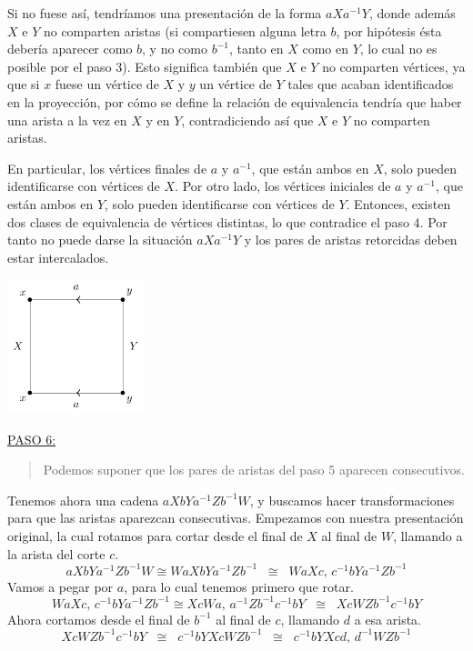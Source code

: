 {    \noindent
    Si no fuese así, tendríamos una presentación de la forma $aXa^{-1}Y$, donde además $X$ e $Y$ no comparten aristas 
    (si compartiesen alguna letra $b$, por hipótesis ésta debería aparecer como $b$, y no como $b^{-1}$, tanto en $X$ como en $Y$, 
    lo cual no es posible por el paso 3). 
    Esto significa también que $X$ e $Y$ no comparten vértices, ya que si $x$ fuese un vértice de $X$ y $y$ un vértice de $Y$ tales que acaban identificados en la proyección,
    por cómo se define la relación de equivalencia tendría que haber una arista a la vez en $X$ y en $Y$, contradiciendo así que $X$ e $Y$ no comparten aristas.

    \vspace{0.5em}
    \noindent
    En particular, los vértices finales de $a$ y $a^{-1}$, que están ambos en $X$, 
    solo pueden identificarse con vértices de $X$. 
    Por otro lado, los vértices iniciales de $a$ y $a^{-1}$, que están ambos en $Y$, 
    solo pueden identificarse con vértices de $Y$. 
    Entonces, existen dos clases de equivalencia de vértices distintas, 
    lo que contradice el paso 4. Por tanto no puede darse la situación $aXa^{-1}Y$ y los pares de aristas retorcidas deben estar intercalados.

    \begin{center}
        \includegraphics[width=0.3\textwidth]{img/teorema-clasificacion/paso5.pdf}
    \end{center}

    \vspace{1.3em}
    \noindent
    \underline{PASO 6:}
    \begin{quote}
        Podemos suponer que los pares de aristas del paso 5 aparecen consecutivos.
    \end{quote}

    \noindent
    Tenemos ahora una cadena $aXbYa^{-1}Zb^{-1}W$, 
    y buscamos hacer transformaciones para que las aristas aparezcan consecutivas. 
    Empezamos con nuestra presentación original, la cual rotamos para cortar desde el final de $X$ al final de $W$, llamando a la arista del corte $c$. 
    \[
        aXbYa^{-1}Zb^{-1}W \cong WaXbYa^{-1}Zb^{-1} \;\;\cong\;\; WaXc \text{, } c^{-1}bYa^{-1}Zb^{-1}
    \]
    \noindent 
    Vamos a pegar por $a$, para lo cual tenemos primero que rotar.
    \[
        WaXc \text{, } c^{-1}bYa^{-1}Zb^{-1} \cong XcWa \text{, } a^{-1}Zb^{-1}c^{-1}bY \;\;\cong\;\; XcWZb^{-1}c^{-1}bY
    \] 
    \noindent
    Ahora cortamos desde el final de $b^{-1}$ al final de $c$, llamando $d$ a esa arista. 
    \[
        XcWZb^{-1}c^{-1}bY \;\;\cong\;\; c^{-1}bYXcWZb^{-1} \;\;\cong\;\; c^{-1}bYXcd \text{, } d^{-1}WZb^{-1}
    \]

}

